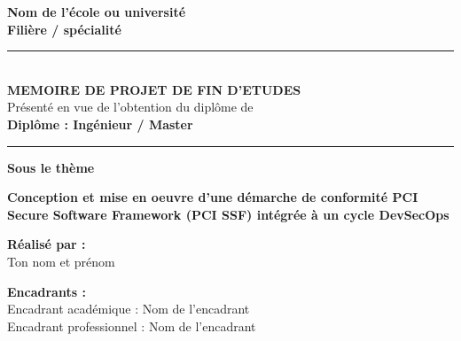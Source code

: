 \begin{titlepage}
    \begin{center}
        \begin{minipage}{0.45\textwidth}
            \raggedright
        \end{minipage}
        \hfill
        \begin{minipage}{0.45\textwidth}
            \raggedleft
        \end{minipage}

        \vspace{1.2cm}

        {\Large \textbf{Nom de l'école ou université}}\\[0.2cm]
        {\large \textbf{Filière / spécialité}}\\[0.8cm]

        \rule{\textwidth}{0.6pt}\\[0.5cm]
        {\LARGE \textbf{MEMOIRE DE PROJET DE FIN D'ETUDES}}\\[0.35cm]
        {\large Présenté en vue de l'obtention du diplôme de}\\[0.2cm]
        {\Large \textbf{Diplôme : Ingénieur / Master}}\\[0.5cm]
        \rule{\textwidth}{0.6pt}

        \vspace{1.5cm}

        {\large \textbf{Sous le thème}}\\[0.5cm]
        \begin{minipage}{0.9\textwidth}
            \centering
            {\Huge \textbf{Conception et mise en oeuvre d'une démarche de conformité PCI Secure Software Framework (PCI SSF) intégrée à un cycle DevSecOps}}
        \end{minipage}

        \vfill

        \begin{minipage}{0.48\textwidth}
            \raggedright
            \textbf{Réalisé par :}\\
            Ton nom et prénom
        \end{minipage}
        \hfill
        \begin{minipage}{0.48\textwidth}
            \raggedright
            \textbf{Encadrants :}\\
            Encadrant académique : Nom de l'encadrant\\
            Encadrant professionnel : Nom de l'encadrant
        \end{minipage}


\end{center}
\end{titlepage}
